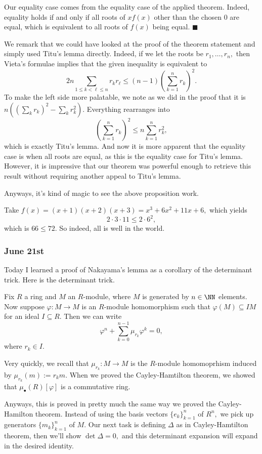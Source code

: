 Our equality case comes from the equality case of the applied theorem. Indeed, equality holds if and only if all roots of $xf(x)$ other than the chosen $0$ are equal, which is equivalent to all roots of $f(x)$ being equal. $\blacksquare$

We remark that we could have looked at the proof of the theorem statement and simply used Titu's lemma directly. Indeed, if we let the roots be $r_1,\ldots,r_n,$ then Vieta's formulae implies that the given inequality is equivalent to
\[2n\sum_{1\le k<\ell\le n}r_kr_\ell\le(n-1)\left(\sum_{k=1}^nr_k\right)^2.\]
To make the left side more palatable, we note as we did in the proof that it is $n\left(\left(\sum_kr_k\right)^2-\sum_kr_k^2\right).$ Everything rearranges into
\[\left(\sum_{k=1}^nr_k\right)^2\le n\sum_{k=1}^nr_k^2,\]
which is exactly Titu's lemma. And now it is more apparent that the equality case is when all roots are equal, as this is the equality case for Titu's lemma. However, it is impressive that our theorem was powerful enough to retrieve this result without requiring another appeal to Titu's lemma.

Anyways, it's kind of magic to see the above proposition work.
\begin{example}
    Take $f(x)=(x+1)(x+2)(x+3)=x^3+6x^2+11x+6,$ which yields
    \[2\cdot3\cdot11\le2\cdot6^2,\]
    which is $66\le72.$ So indeed, all is well in the world.
\end{example}

\subsubsection{June 21st}
Today I learned a proof of Nakayama's lemma as a corollary of the determinant trick. Here is the determinant trick.
\begin{proposition}
    Fix $R$ a ring and $M$ an $R$-module, where $M$ is generated by $n\in\NN$ elements. Now suppose $\varphi:M\to M$ is an $R$-module homomorphism such that $\varphi(M)\subseteq IM$ for an ideal $I\subseteq R.$ Then we can write
    \[\varphi^n+\sum_{k=0}^{n-1}\mu_{r_k}\varphi^k=0,\]
    where $r_k\in I.$
\end{proposition}
Very quickly, we recall that $\mu_{r_k}:M\to M$ is the $R$-module homomoprhism induced by $\mu_{r_k}(m):=r_km.$ When we proved the Cayley-Hamtilton theorem, we showed that $\mu_\bullet(R)[\varphi]$ is a commutative ring.

Anyways, this is proved in pretty much the same way we proved the Cayley-Hamilton theorem. Instead of using the basis vectors $\{e_k\}_{k=1}^n$ of $R^n,$ we pick up generators $\{m_k\}_{k=1}^n$ of $M.$ Our next task is defining $\Delta$ as in Cayley-Hamtilton theorem, then we'll show $\det\Delta=0,$ and this determinant expansion will expand in the desired identity.

